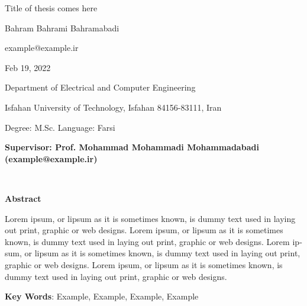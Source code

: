 \thispagestyle{empty}

\begin{latin}
\begin{center}

{\huge Title of thesis comes here}

\vspace{1cm}

{\LARGE{Bahram Bahrami Bahramabadi}}

\vspace{0.2cm}

{\small example@example.ir}

\vspace{0.5cm}

Feb 19, 2022

\vspace{0.5cm}

Department of Electrical and Computer Engineering

\vspace{0.2cm}

Isfahan University of Technology, Isfahan 84156-83111, Iran

\vspace{0.2cm}

Degree: M.Sc. \hspace*{3cm} Language: Farsi

\vspace{1cm}

{\small\textbf{Supervisor: Prof. Mohammad Mohammadi Mohammadabadi (example@example.ir)}}
\end{center}
~\vfill


\noindent\textbf{Abstract}

\begin{small}
\baselineskip=0.6cm

Lorem ipsum, or lipsum as it is sometimes known, is dummy text used in laying out print, graphic or web designs. Lorem ipsum, or lipsum as it is sometimes known, is dummy text used in laying out print, graphic or web designs. Lorem ipsum, or lipsum as it is sometimes known, is dummy text used in laying out print, graphic or web designs. Lorem ipsum, or lipsum as it is sometimes known, is dummy text used in laying out print, graphic or web designs. 

\end{small}

\vspace{0.5 cm}

\noindent \textbf{Key Words}: Example, Example, Example, Example

\end{latin}